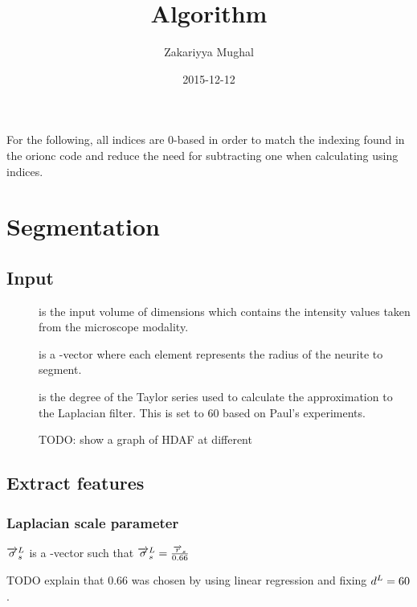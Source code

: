 \documentclass[12pt]{article}
\title{Algorithm}
\author{Zakariyya Mughal}
\date{2015-12-12}
\begin{document}
\maketitle
\tableofcontents

For the following, all indices are 0-based in order to match the
indexing found in the \gls{orionc} code and reduce the need for
subtracting one when calculating using indices.

\section{Segmentation}

\subsection{Input}

\begin{description}
	\item[\InputVolume{}] is the input volume of dimensions
		\InputVolumeDimensions{} which contains the intensity values taken
		from the microscope modality.
	\item[\RadiiScales{}] is a \Dim{\RadiiScalesName}-vector where each element
		represents the radius of the neurite to segment.
	\item[\LaplacianFilterApproxDegree{}] is the degree of the
		Taylor series used to calculate the approximation
		to the Laplacian filter. This is set to \(60\) based on Paul's
		experiments.

		TODO: show a graph of HDAF at different
\end{description}

\subsection{Extract features}

\subsubsection{Laplacian scale parameter}

\newcommand{\LaplacianScalesName}{\vect{\sigma}^{L}}
\newcommand{\LaplacianScales}{\LaplacianScalesName_{s}}

\(\LaplacianScales\) is a \Dim{\RadiiScalesName}-vector such that
\(
\LaplacianScales = \frac{\RadiiScales{}}{0.66}
\)

TODO explain that 0.66 was chosen by using linear regression and fixing
\(d^{L}{} = 60\).
\end{document}
